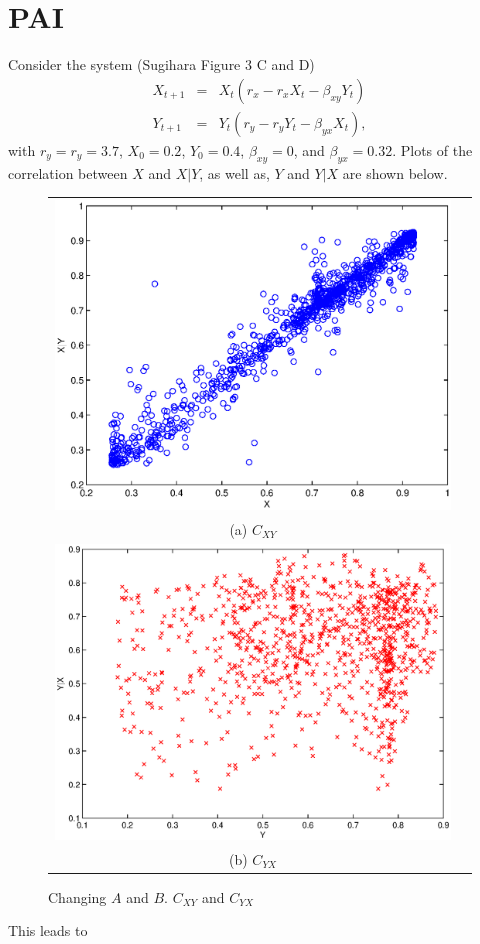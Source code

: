 \documentclass{article}
\begin{document}
\section{PAI}
Consider the system (Sugihara Figure 3 C and D)
\begin{eqnarray}
X_{t+1} &=& X_t\left(r_x-r_xX_t-\beta_{xy}Y_t\right)\\
Y_{t+1} &=& Y_t\left(r_y-r_yY_t-\beta_{yx}X_t\right),
\end{eqnarray}
with $r_y=r_y=3.7$, $X_0 = 0.2$, $Y_0=0.4$, $\beta_{xy}=0$, and $\beta_{yx}=0.32$.  Plots of the correlation between $X$ and $X|Y$, as well as, $Y$ and $Y|X$ are shown below.
\begin{center}
\begin{figure}[H]
\begin{tabular}{cc}
\includegraphics[scale=0.5]{SugFig3_XgY.eps} \\
(a) $C_{XY}$ \\[6pt]
\includegraphics[scale=0.5]{SugFig3_YgX.eps} \\
(b) $C_{YX}$ \\[6pt]
\end{tabular}
\caption{Changing $A$ and $B$.  $C_{XY}$ and $C_{YX}$}
\label{fig1}
\end{figure}
\end{center}
This leads to
\end{document}
